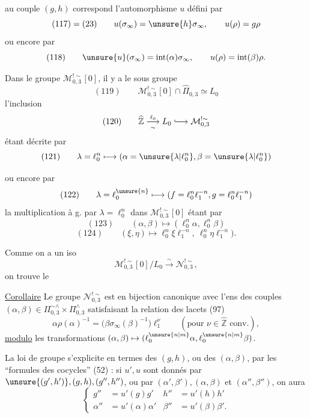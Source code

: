 
au couple 
$(g,h)$ correspond l'automorphisme $u$ défini par
\[
 (117)=(23)\qquad
 u(\sigma_\infty)=\unsure{h}\sigma_\infty,\qquad
 u(\rho)=g\rho
\]
ou encore par
\[
 (118)\qquad
 \unsure{u}(\sigma_\infty)=\mathrm{int}(\alpha)\sigma_\infty,\qquad
 u(\rho)=\mathrm{int}(\beta)\rho.
\]

Dans le groupe $\mathcal M_{0,3}^{!\sim}[0]$, il y a le sous groupe
\[
 (119)\qquad
 \mathcal M_{0,3}^{!\sim}[0]\cap\widehat{\Pi}_{0,3}\simeq L_0
\]
l'inclusion
\[
 (120)\qquad
 \widehat{\mathbb Z}\overset{\ell_0}{\underset{\sim}{\longrightarrow}}
 L_0\lhook\joinrel\longrightarrow\mathcal M_{0,3}^{!\sim}
\]
étant décrite par
\[
 (121)\qquad
 \lambda=\ell_0^n\longmapsto
 (\alpha=\unsure{\lambda|\ell_0^n},
 \beta=\unsure{\lambda|\ell_0^n})
\]

ou encore par
\[
 (122)\qquad
 \lambda=\ell_0^{\unsure{n}}\longmapsto
 (f=\ell_0^n\ell_1^{-n},g=\ell_0^n\ell_1^{-n})
\]
la multiplication  à g. par 
$\lambda=\ell_0^n$ dans $\mathcal M_{0,3}^{!\sim}[0]$
étant  par
\[
 (123)\qquad
 (\alpha,\beta)\longmapsto(\ell_0^n\alpha,\ell_0^n\beta)
\]
\[
 (124)\qquad
 (\xi,\eta)\longmapsto
 \ell_0^n\xi\ell_1^{-n},\ \ell_0^n\eta\ell_1^{-n}).
\]


Comme on a un iso
\[
\mathcal M_{0,3}^{!\sim}[0]/L_0
\xrightarrow{\sim}\mathcal N_{0,3}^{!\sim},
\]
on trouve le

\uline{Corollaire} Le groupe $\mathcal N_{0,3}^{!\sim}$ est en bijection
canonique avec l'ens des couples
$(\alpha,\beta)\in\Pi_{0,3}^{\sim\wedge}\times\Pi_{0,3}^{\wedge}$
satisfaisant la relation des lacets (97)
\[
\alpha\rho(\alpha)^{-1}
=\bigl(\beta\sigma_\infty(\beta)^{-1}\bigr)\ell_1^\nu
\qquad(\text{pour }\nu\in\widehat{\mathbb Z}\text{ conv.}),
\]
\uline{modulo} les transformations
$(\alpha,\beta)\mapsto(\ell_0^{\unsure{n|m}}\alpha,\ell_0^{\unsure{n|m}}\beta)$.

La loi de groupe  s'explicite en termes des $(g,h)$, ou des
$(\alpha,\beta)$, par les ``formules des cocycles'' (52) : si $u',u$
 sont donnés par
$\unsure{(g',h')},(g,h),(g'',h'')$, ou par
$(\alpha',\beta'),(\alpha,\beta)$ et $(\alpha'',\beta'')$, on aura
\[
\tag{125}
\left\{
\begin{aligned}
g''&=u'(g)g'&h''&=u'(h)h'\\
\alpha''&=u'(\alpha)\alpha'&\beta''&=u'(\beta)\beta'.
\end{aligned}
\right.
\]

